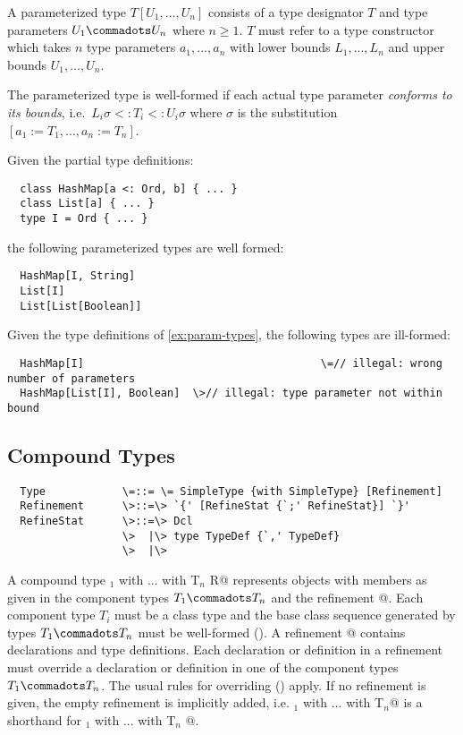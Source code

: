\documentclass[11pt]{report}
\begin{document}
A parameterized type $T[U_1, ..., U_n]$ consists of a type designator
$T$ and type parameters $U_1 \commadots U_n$ where $n \geq 1$.  $T$
must refer to a type constructor which takes $n$ type parameters $a_1,
..., a_n$ with lower bounds $L_1, ..., L_n$ and upper bounds $U_1,
..., U_n$.

The parameterized type is well-formed if each actual type parameter
{\em conforms to its bounds}, i.e.\ $L_i\sigma <: T_i <: U_i\sigma$ where $\sigma$
is the substitution $[a_1 := T_1, ..., a_n := T_n]$.

\example\label{ex:param-types}
Given the partial type definitions:

\begin{verbatim}
  class HashMap[a <: Ord, b] { ... }
  class List[a] { ... }
  type I = Ord { ... }
\end{verbatim}

the following parameterized types are well formed:

\begin{verbatim}
  HashMap[I, String]
  List[I]
  List[List[Boolean]]
\end{verbatim}

\example Given the type definitions of \ref{ex:param-types},
the following types are ill-formed:

\begin{verbatim}
  HashMap[I]			                         \=// illegal: wrong number of parameters
  HashMap[List[I], Boolean]  \>// illegal: type parameter not within bound
\end{verbatim}

\subsection{Compound Types}
\label{sec:compound-types}

\syntax\begin{verbatim} 
  Type            \=::= \= SimpleType {with SimpleType} [Refinement]
  Refinement      \>::=\> `{' [RefineStat {`;' RefineStat}] `}'
  RefineStat      \>::=\> Dcl
                  \>  |\> type TypeDef {`,' TypeDef}
                  \>  |\>
\end{verbatim}

A compound type \verb@T$_1$ with ... with T$_n$ {R}@ represents
objects with members as given in the component types $T_1 \commadots
T_n$ and the refinement @. Each component type $T_i$ must be a
class type and the base class sequence generated by types $T_1
\commadots T_n$ must be well-formed (). A
refinement @ contains declarations and type
definitions. Each declaration or definition in a refinement must
override a declaration or definition in one of the component types
$T_1 \commadots T_n$. The usual rules for overriding (\sref{})
apply. If no refinement is given, the empty refinement is implicitly
added, i.e. \verb@T$_1$ with ... with T$_n$@ is a shorthand for
\verb@T$_1$ with ... with T$_n$ {}@.
 
\end{document}

